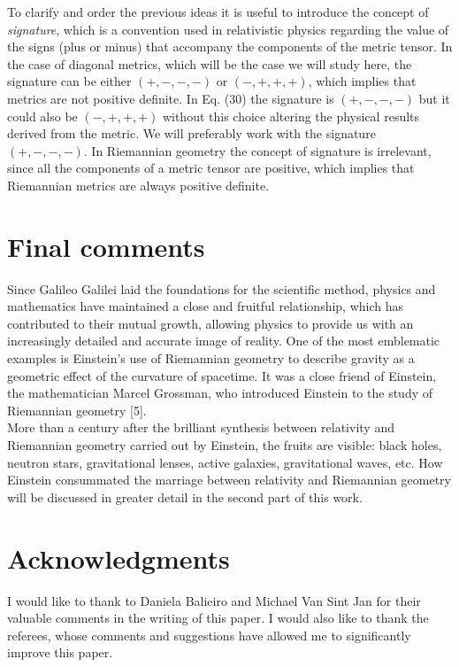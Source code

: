 \documentclass[11pt,letterpaper]{article}
\begin{document}
To clarify and order the previous ideas it is useful to introduce the concept of \textit{signature}, which is a convention used in relativistic physics regarding the value of the signs (plus or minus) that accompany the components of the metric tensor. In the case of diagonal metrics, which will be the case we will study here, the  signature can be either $(+,-,-,-)$ or $(-,+,+,+)$, which implies that metrics are not positive definite. In Eq. (30) the signature is $(+,-,-,-)$ but it could also be $(-,+,+,+)$ without this choice altering the physical results derived from the metric. We will preferably work with the signature $(+,-,-,-)$. In Riemannian geometry the concept of signature is irrelevant, since all the components of a metric tensor are positive, which implies that Riemannian metrics are always positive definite.


\section{Final comments}

Since Galileo Galilei laid the foundations for the scientific method, physics and mathematics have maintained a close and fruitful relationship, which has contributed to their mutual growth, allowing physics to provide us with an increasingly detailed and accurate image of reality. One of the most emblematic examples is Einstein's use of Riemannian geometry to describe gravity as a geometric effect of the curvature of spacetime. It was a close friend of Einstein, the mathematician Marcel Grossman, who introduced Einstein to the study of Riemannian geometry [5].\\

More than a century after the brilliant synthesis between relativity and Riemannian geometry carried out by Einstein, the fruits are visible: black holes, neutron stars, gravitational lenses, active galaxies, gravitational waves, etc. How Einstein consummated the marriage between relativity and Riemannian geometry will be discussed in greater detail in the second part of this work.


\section*{Acknowledgments}
I would like to thank to Daniela Balieiro and Michael Van Sint Jan for their valuable comments in the writing of this paper. I would also like to thank the referees, whose comments and suggestions have allowed me to significantly improve this paper.
\end{document}
